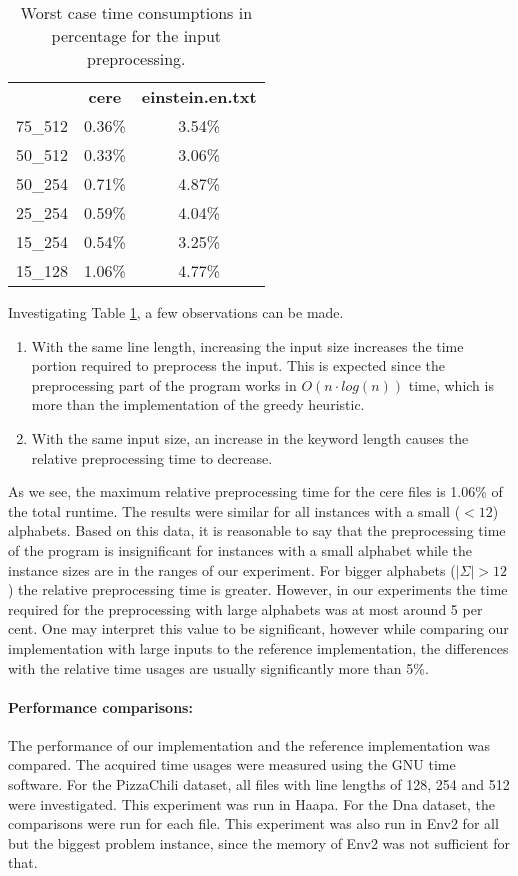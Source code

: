 \documentclass[english,twoside,censored,csm,algorithms-track-2020]{HYthesisML}
\theoremstyle{plain}
\theoremstyle{definition}
\begin{document}
\begin{table}
\begin{centering}
\begin{tabular}{l | c c}
  & \textbf{cere} & \textbf{einstein.en.txt} \\
  75\_512 & 0.36\% & 3.54\% \\
  50\_512 & 0.33\% & 3.06\% \\
  50\_254 & 0.71\% & 4.87\% \\
  25\_254 & 0.59\% & 4.04\% \\
  15\_254 & 0.54\% & 3.25\% \\
  15\_128 & 1.06\% & 4.77\% \\
\end{tabular}
  \caption{Worst case time consumptions in percentage for the input preprocessing.}
  \label{table-duplicate-time}
\end{centering}
\end{table}
Investigating Table \ref{table-duplicate-time}, a few observations can be made.

\begin{enumerate}
\item With the same line length, increasing the input size increases the time portion required to preprocess the input. This is expected since the preprocessing part of the program works in $O(n\cdot log(n))$ time, which is more than the implementation of the greedy heuristic.
\item With the same input size, an increase in the keyword length causes the relative preprocessing time to decrease. 
\end{enumerate}

As we see, the maximum relative preprocessing time for the cere files is 1.06\% of the total runtime.
The results were similar for all instances with a small ($<12$) alphabets. Based on this data,
it is reasonable to say that the preprocessing time of the program is insignificant for instances
with a small alphabet while the instance sizes are in the ranges of our experiment. For bigger
alphabets ($|\Sigma|>12$) the relative preprocessing time is greater. However, in our experiments
the time required for the preprocessing with large alphabets was at most around 5 per cent. One may
interpret this value to be significant, however while comparing our implementation with large
inputs to the reference implementation, the differences with the relative time usages are usually
significantly more than 5\%.


\paragraph{Performance comparisons:}
The performance of our implementation and the reference implementation was compared. The acquired
time usages were measured using the GNU time software. For the PizzaChili dataset, all files with line
lengths of 128, 254 and 512 were investigated. This experiment was run in Haapa. For the Dna dataset,
the comparisons were run for each file. This experiment was also run in Env2 for all but the
biggest problem instance, since the memory of Env2 was not sufficient for that.
\end{document}
